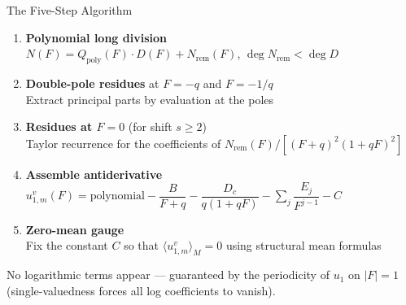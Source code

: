 \documentclass[aspectratio=169, 11pt]{beamer}
\newcommand{\mean}[1]{\langle #1 \rangle}
\begin{document}
\begin{frame}{The Five-Step Algorithm}

\begin{enumerate}
    \setlength{\itemsep}{0.3em}

    \item \textbf{Polynomial long division}\\
    $N(F) = Q_{\text{poly}}(F) \cdot D(F) + N_{\text{rem}}(F)$,
    \quad $\deg N_{\text{rem}} < \deg D$

    \item \textbf{Double-pole residues} at $F = -q$ and $F = -1/q$\\
    Extract principal parts by evaluation at the poles

    \item \textbf{Residues at $F = 0$} (for shift $s \ge 2$)\\
    Taylor recurrence for the coefficients of
    $N_{\text{rem}}(F)/[(F+q)^2(1+qF)^2]$

    \item \textbf{Assemble antiderivative}\\
    $u_{1,m}^v(F) = \text{polynomial}
    - \dfrac{B}{F+q} - \dfrac{D_c}{q(1+qF)}
    - \sum_{j} \dfrac{E_j}{F^{j-1}} - C$

    \item \textbf{Zero-mean gauge}\\
    Fix the constant $C$ so that $\mean{u_{1,m}^v}_M = 0$
    using structural mean formulas
\end{enumerate}

\vspace{0.3em}
\alert{No logarithmic terms appear} --- guaranteed by the periodicity
of $u_1$ on $|F|=1$ (single-valuedness forces all log coefficients to vanish).

\end{frame}
\end{document}
